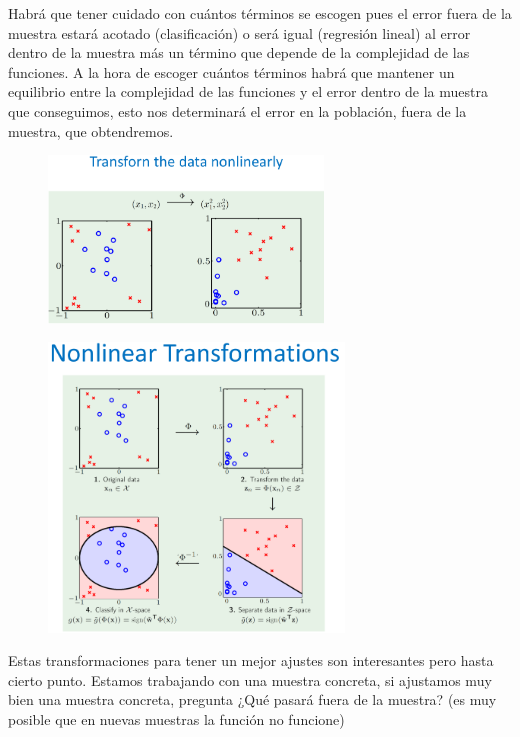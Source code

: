 \documentclass[11pt,a4paper]{article}
\theoremstyle{definition}
\begin{document}
	Habrá que tener cuidado con cuántos términos se escogen pues el error fuera de la muestra estará acotado (clasificación) o será igual (regresión lineal) al error dentro de la muestra más un término que depende de la complejidad de las funciones. A la hora de escoger cuántos términos habrá que mantener un equilibrio entre la complejidad de las funciones y el error dentro de la muestra que conseguimos, esto nos determinará el error en la población, fuera de la muestra, que obtendremos.
	
	\begin{figure}[H]
		\centering
		\includegraphics[width=0.65\textwidth]{images/transforn}
	\end{figure}
	
	\begin{figure}[H]
		\centering
		\includegraphics[width=0.7\textwidth]{images/nonlinear_transforn}
	\end{figure}
	Estas transformaciones para tener un mejor ajustes son interesantes pero hasta cierto punto. Estamos trabajando con una muestra concreta, si ajustamos muy bien una muestra concreta, pregunta ¿Qué pasará fuera de la muestra? (es muy posible que en nuevas muestras la función no funcione)
	
\end{document}
